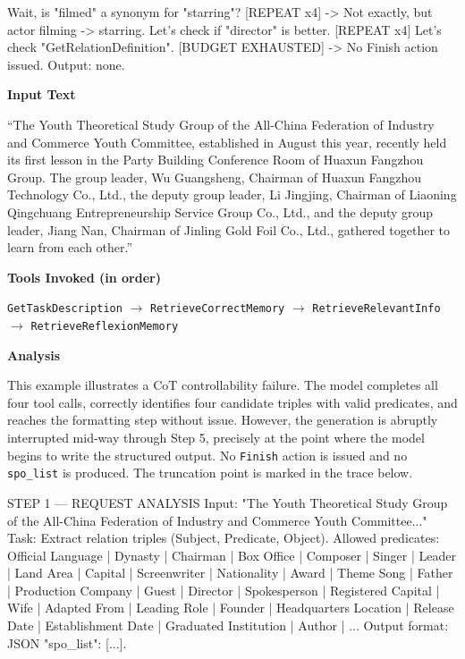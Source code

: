 \begin{appendices}
\begin{tcolorbox}[tracebox, title=Model Reasoning Trace]
  Wait, is "filmed" a synonym for "starring"?                [REPEAT x4]
    -> Not exactly, but actor filming -> starring.
  Let's check if "director" is better.                       [REPEAT x4]
  Let's check "GetRelationDefinition".                       [BUDGET EXHAUSTED]
  -> No Finish action issued. Output: none.
\end{tcolorbox}

\begin{tcolorbox}[errorbox, title=Example 2 — CoT Controllability Failure
(AgentRE\textsubscript{redux} with Correct and Reflexion Memories
Test Set Sample 1 Attempt 1)]

\textbf{Input Text}

\smallskip\small
``The Youth Theoretical Study Group of the All-China Federation of
Industry and Commerce Youth Committee, established in August this year,
recently held its first lesson in the Party Building Conference Room of
Huaxun Fangzhou Group. The group leader, Wu Guangsheng, Chairman of
Huaxun Fangzhou Technology Co., Ltd., the deputy group leader, Li
Jingjing, Chairman of Liaoning Qingchuang Entrepreneurship Service
Group Co., Ltd., and the deputy group leader, Jiang Nan, Chairman of
Jinling Gold Foil Co., Ltd., gathered together to learn from each
other.''

\medskip
\textbf{Tools Invoked (in order)}

\smallskip\small
\texttt{GetTaskDescription} $\rightarrow$
\texttt{RetrieveCorrectMemory} $\rightarrow$
\texttt{RetrieveRelevantInfo} $\rightarrow$
\texttt{RetrieveReflexionMemory}

\medskip
\textbf{Analysis}

\smallskip\small
This example illustrates a CoT controllability failure. The model
completes all four tool calls, correctly identifies four candidate
triples with valid predicates, and reaches the formatting step without
issue. However, the generation is abruptly interrupted mid-way through
Step 5, precisely at the point where the model begins to write the
structured output. No \texttt{Finish} action is issued and no
\texttt{spo\_list} is produced. The truncation point is marked in the
trace below.

\end{tcolorbox}

\begin{tcolorbox}[tracebox, title=Model Reasoning Trace]
STEP 1 — REQUEST ANALYSIS
  Input: "The Youth Theoretical Study Group of the All-China
          Federation of Industry and Commerce Youth Committee..."
  Task:  Extract relation triples (Subject, Predicate, Object).
  Allowed predicates: Official Language | Dynasty | Chairman |
    Box Office | Composer | Singer | Leader | Land Area | Capital |
    Screenwriter | Nationality | Award | Theme Song | Father |
    Production Company | Guest | Director | Spokesperson |
    Registered Capital | Wife | Adapted From | Leading Role |
    Founder | Headquarters Location | Release Date |
    Establishment Date | Graduated Institution | Author | ...
  Output format: JSON {"spo_list": [...]}.


\end{tcolorbox}
\end{appendices}
